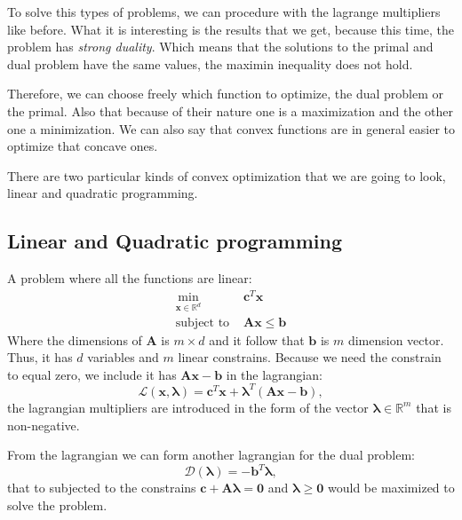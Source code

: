 \documentclass[]{article}
\theoremstyle{definition}
\begin{document}
To solve this types of problems, we can procedure with the lagrange multipliers like before. What it is interesting is the results that we get, because this time, the problem has \textit{strong duality}. Which means that the solutions to the primal and dual problem have the same values, the maximin inequality does not hold. 

Therefore, we can choose freely which function to optimize, the dual problem or the primal. Also that because of their nature one is a maximization and the other one a minimization. We can also say that convex functions are in general easier to optimize that concave ones.

There are two particular kinds of convex optimization that we are going to look, linear and quadratic programming. 

\subsection{Linear and Quadratic programming}
A problem where all the functions are linear:
\begin{align*}
	\min_{\boldsymbol{x}\in\mathbb{R}^d} &\boldsymbol{c}^T\boldsymbol{x} \\
	\text{subject to } &\boldsymbol{A}\boldsymbol{x}\leq \boldsymbol{b}
\end{align*}
Where the dimensions of $\boldsymbol{A}$ is $m\times d$ and it follow that $\boldsymbol{b}$ is  $m$ dimension vector. Thus, it has $d$ variables and $m$ linear constrains. Because we need the constrain to equal zero, we include it has $\boldsymbol{A}\boldsymbol{x} - \boldsymbol{b}$ in the lagrangian:
\begin{equation*}
	\mathcal{L}(\boldsymbol{x}, \boldsymbol{\lambda}) = \boldsymbol{c}^T\boldsymbol{x} + \boldsymbol{\lambda}^T (\boldsymbol{A}\boldsymbol{x} - \boldsymbol{b}),
\end{equation*}
the lagrangian multipliers are introduced in the form of the vector $\boldsymbol{\lambda}\in\mathbb{R}^m$ that is non-negative.

From the lagrangian we can form another lagrangian for the dual problem:
\begin{equation*}
	\mathcal{D}(\boldsymbol{\lambda}) = -  \boldsymbol{b}^T\boldsymbol{\lambda},
\end{equation*}
that to subjected to the constrains $\boldsymbol{c} + \boldsymbol{A}\boldsymbol{\lambda} = \boldsymbol{0}$ and $\boldsymbol{\lambda} \geq \boldsymbol{0}$ would be maximized to solve the problem.
\end{document}
